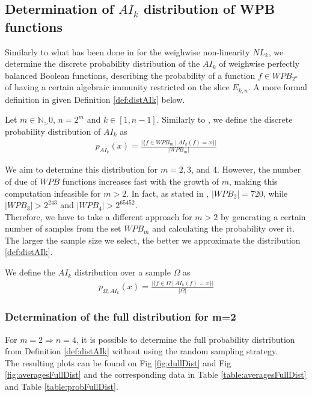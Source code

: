 \documentclass[11pt]{llncs}
\begin{document}
\subsection{Determination of \texorpdfstring{$AI_k$}{AIk} distribution of WPB functions}
Similarly to what has been done in \cite{Latin:GinMea23} for the weighwise non-linearity $NL_k$, we determine the discrete probability distribution of the $AI_k$ of weighwise perfectly balanced Boolean functions, describing the probability of a function $f\in WPB_{2^n}$ of having a certain algebraic immunity restricted on the slice $E_{k,n}$. A more formal definition in given Definition \ref{def:distAIk} below.

\begin{definition}\label{def:distAIk}
    Let $m \in \mathbb{N}_> 0$, $n = 2^m$ and $k \in [1,n-1]$. Similarly to \cite{Latin:GinMea23}, we define the discrete probability distribution of $AI_k$ as
    \begin{align*}
        p_{AI_k}(x) = \frac{\bigg|\{f\in WPB_m\  |\  AI_k(f) = x\}\bigg|}{|WPB_m|}
    \end{align*}
\end{definition}

We aim to determine this distribution for $m = 2, 3$, and $4$. However, the number of due of $WPB$ functions increases fast with the growth of $m$, making this computation infeasible for $m > 2$. In fact, as stated in \cite{Latin:GinMea23}, $|WPB_2| = 720$, while $|WPB_3| > 2^{243}$ and $|WPB_4| > 2^{65452}$.\\
Therefore, we have to take a different approach for $m > 2$ by generating a certain number of samples from the set $WPB_m$ and calculating the probability over it. The larger the sample size we select, the better we approximate the distribution \ref{def:distAIk}.

\begin{definition}
    We define the $AI_k$ distribution over a sample $\Omega$ as
    \begin{align*}
        p_{\Omega, AI_k}(x) =  \frac{\bigg|\{f\in \Omega\ |\  AI_k(f) = x\}\bigg|}{|\Omega|}
    \end{align*}
\end{definition}


\subsubsection{Determination of the full distribution for \texorpdfstring{m=2}{m=2}}
For $m=2 \Rightarrow n = 4$, it is possible to determine the full probability distribution from Definition \ref{def:distAIk} without using the random sampling strategy.\\
The resulting plots can be found on Fig \ref{fig:dullDist} and Fig \ref{fig:averagesFullDist} and the corresponding data in Table \ref{table:averagesFullDist} and Table \ref{table:probFullDist}.
\end{document}
